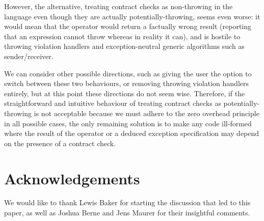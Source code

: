 However, the alternative, treating contract checks as non-throwing in the language even though they are actually potentially-throwing, seems even worse: it would mean that the  operator would return a factually wrong result (reporting that an expression cannot throw whereas in reality it can), and is hostile to throwing violation handlers and exception-neutral generic algorithms such as sender/receiver.

We can consider other possible directions, such as giving the user the option to switch between these two behaviours, or removing throwing violation handlers entirely, but at this point these directions do not seem wise. Therefore, if the straightforward and intuitive behaviour of treating contract checks as potentially-throwing is not acceptable because we must adhere to the zero overhead principle in all possible cases, the only remaining solution is to make any code ill-formed where the result of the  operator or a deduced exception specification may depend on the presence of a contract check.




\section*{Acknowledgements}
We would like to thank Lewis Baker for starting the discussion that led to this paper, as well as Joshua Berne and Jens Maurer for their insightful comments.

\renewcommand{\bibname}{References}




